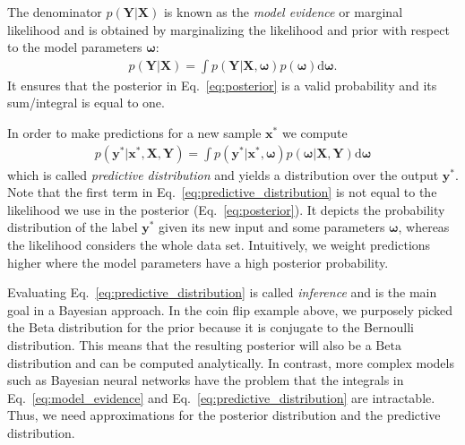 \documentclass[runningheads]{llncs}
\begin{document}
The denominator $p\left(\mathbf{Y}|\mathbf{X}\right)$ is known as the \textit{model evidence} or marginal likelihood and is obtained by marginalizing the likelihood and prior with respect to the model parameters $\boldsymbol{\omega}$:
\begin{align}
    p(\mathbf{Y} | \mathbf{X}) = \int p(\mathbf{Y} | \mathbf{X}, \boldsymbol{\omega})p\left(\boldsymbol{\omega}\right) \text{d}\boldsymbol{\omega}\label{eq:model_evidence}.
\end{align}
It ensures that the posterior in Eq.~\ref{eq:posterior} is a valid probability and its sum/integral is equal to one.

In order to make predictions for a new sample $\mathbf{x}^*$ we compute
\begin{align}
    p(\mathbf{y}^*|\mathbf{x}^*, \mathbf{X}, \mathbf{Y}) = \int p\left(\mathbf{y}^* | \mathbf{x}^*, \boldsymbol{\omega} \right) p\left(\boldsymbol{\omega} | \mathbf{X}, \mathbf{Y} \right) \text{d}\boldsymbol{\omega}\label{eq:predictive_distribution}
\end{align}
which is called \textit{predictive distribution} and yields a distribution over the output $\mathbf{y}^*$.
Note that the first term in Eq.~\ref{eq:predictive_distribution} is not equal to the likelihood we use in the posterior (Eq.~\ref{eq:posterior}).
It depicts the probability distribution of the label $\mathbf{y}^*$ given its new input and some parameters $\boldsymbol{\omega}$, whereas the likelihood considers the whole data set.
Intuitively, we weight predictions higher where the model parameters have a high posterior probability.

Evaluating Eq.~\ref{eq:predictive_distribution} is called \textit{inference} and is the main goal in a Bayesian approach. 
In the coin flip example above, we purposely picked the $\mathrm{Beta}$ distribution for the prior because it is conjugate to the Bernoulli distribution.
This means that the resulting posterior will also be a $\mathrm{Beta}$ distribution and can be computed analytically.
In contrast, more complex models such as Bayesian neural networks have the problem that the integrals in Eq.~\ref{eq:model_evidence} and Eq.~\ref{eq:predictive_distribution} are intractable.
Thus, we need approximations for the posterior distribution and the predictive distribution.

\end{document}
